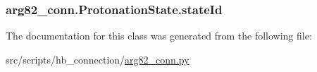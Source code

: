 \hypertarget{classarg82__conn_1_1_protonation_state_aaa69f1fdb8173e169d4d70c5246bfece}{
\subsubsection[{state\-Id}]{\setlength{\rightskip}{0pt plus 5cm}arg82\-\_\-conn.\-Protonation\-State.\-state\-Id}}\label{classarg82__conn_1_1_protonation_state_aaa69f1fdb8173e169d4d70c5246bfece}


The documentation for this class was generated from the following file\-:\begin{DoxyCompactItemize}
\item 
src/scripts/hb\-\_\-connection/\hyperlink{arg82__conn_8py}{arg82\-\_\-conn.\-py}\end{DoxyCompactItemize}
